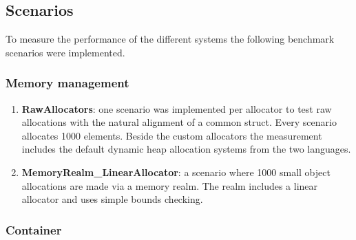 \subsection{Scenarios}

To measure the performance of the different systems the following benchmark scenarios were implemented. 

\subsubsection{Memory management}

\begin{enumerate}
	\item \textbf{RawAllocators}: one scenario was implemented per allocator to test raw allocations with the natural alignment of a common struct. Every scenario allocates 1000 elements. Beside the custom allocators the measurement includes the default dynamic heap allocation systems from the two languages.
	
	\item \textbf{MemoryRealm\_LinearAllocator}: a scenario where 1000 small object allocations are made via a memory realm. The realm includes a linear allocator and uses simple bounds checking.
\end{enumerate}

\subsubsection{Container}

